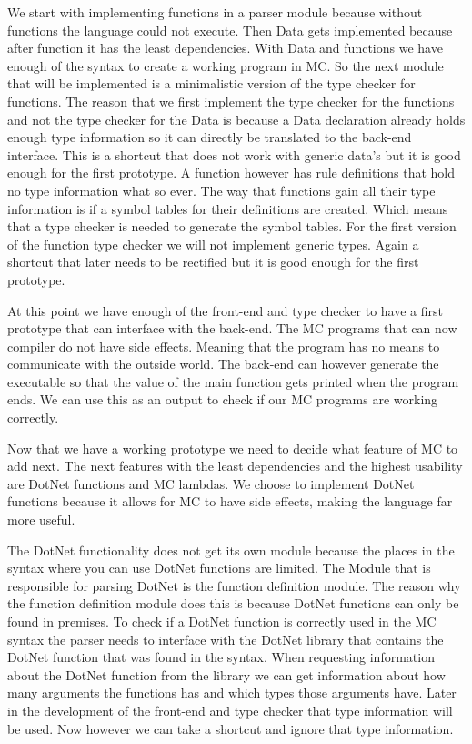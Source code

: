 We start with implementing functions in a parser module because without functions the language could not execute. 
Then Data gets implemented because after function it has the least dependencies.
With Data and functions we have enough of the syntax to create a working program in MC.
So the next module that will be implemented is a minimalistic version of the type checker for functions. The reason that we first implement the type checker for the functions and not the type checker for the Data is because  a Data declaration already holds enough type information so it can directly be translated to the back-end interface. This is a shortcut that does not work with generic data’s but it is good enough for the first prototype. A function however has rule definitions that hold no type information what so ever. The way that functions gain all their type information is if a symbol tables for their definitions are created. Which means that a type checker is needed to generate the symbol tables.
For the first version of the function type checker we will not implement generic types. Again a shortcut that later needs to be rectified but it is good enough for the first prototype. 

At this point we have enough of the front-end and type checker to have a first prototype that can interface with the back-end. The MC programs that can now compiler do not have side effects. Meaning that the program has no means to communicate with the outside world. The back-end can however generate the executable so that the value of the main function gets printed when the program ends. We can use this as an output to check if our MC programs are working correctly.

Now that we have a working prototype we need to decide what feature of MC to add next. The next features with the least dependencies and the highest usability are DotNet functions and MC lambdas. We choose to implement DotNet functions because it allows for MC to have side effects, making the language far more useful.

The DotNet functionality does not get its own module because the places in the syntax where you can use DotNet functions are limited. The Module that is responsible for parsing DotNet is the function definition module. The reason why the function definition module does this is because DotNet functions can only be found in premises. To check if a DotNet function is correctly used in the MC syntax the parser needs to interface with the DotNet library that contains the DotNet function that was found in the syntax. When requesting information about the DotNet function from the library we can get information about how many arguments the functions has and which types those arguments have. Later in the development of the front-end and type checker that type information will be used. Now however we can take a shortcut and ignore that type information. 

